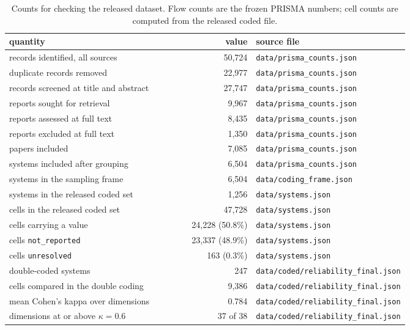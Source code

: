\begin{table}[htbp]
\caption{Counts for checking the released dataset. Flow counts are the frozen PRISMA numbers;
cell counts are computed from the released coded file.}
\label{tab:release-counts}
\footnotesize
\begin{tabular}{@{}p{0.42\linewidth} r p{0.34\linewidth}@{}}
\toprule
quantity & value & source file \tabularnewline
\midrule
records identified, all sources & 50,724 & \texttt{data/prisma\_counts.json} \\
duplicate records removed & 22,977 & \texttt{data/prisma\_counts.json} \\
records screened at title and abstract & 27,747 & \texttt{data/prisma\_counts.json} \\
reports sought for retrieval & 9,967 & \texttt{data/prisma\_counts.json} \\
reports assessed at full text & 8,435 & \texttt{data/prisma\_counts.json} \\
reports excluded at full text & 1,350 & \texttt{data/prisma\_counts.json} \\
papers included & 7,085 & \texttt{data/prisma\_counts.json} \\
systems included after grouping & 6,504 & \texttt{data/prisma\_counts.json} \\
systems in the sampling frame & 6,504 & \texttt{data/coding\_frame.json} \\
systems in the released coded set & 1,256 & \texttt{data/systems.json} \\
cells in the released coded set & 47,728 & \texttt{data/systems.json} \\
cells carrying a value & 24,228 (50.8\%) & \texttt{data/systems.json} \\
cells \texttt{not\_reported} & 23,337 (48.9\%) & \texttt{data/systems.json} \\
cells \texttt{unresolved} & 163 (0.3\%) & \texttt{data/systems.json} \\
double-coded systems & 247 & \texttt{data/coded/reliability\_final.json} \\
cells compared in the double coding & 9,386 & \texttt{data/coded/reliability\_final.json} \\
mean Cohen's kappa over dimensions & 0.784 & \texttt{data/coded/reliability\_final.json} \\
dimensions at or above $\kappa = 0.6$ & 37 of 38 & \texttt{data/coded/reliability\_final.json} \\
\bottomrule
\end{tabular}
\end{table}

